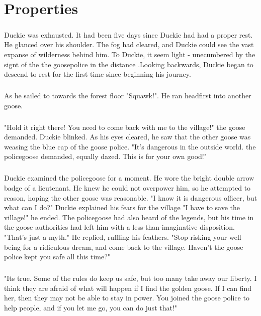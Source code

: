 \chapter{Properties}
\paragraph{} Duckie was exhausted. It had been five days since Duckie had had a proper rest. He glanced over his shoulder. The fog had cleared, and Duckie could see the vast expanse of wilderness behind him. To Duckie, it seem light - unecumbered by the signt of the the goosepolice in the distance .Looking backwards, Duckie began to descend to rest for the first time since beginning his journey. 
\paragraph{} As he sailed to towards the forest floor "Squawk!". He ran headfirst into another goose.
\paragraph{} "Hold it right there! You need to come back with me to the village!" the goose demanded. Duckie blinked. As his eyes cleared, he saw that the other goose was weasing the blue cap of the goose police. "It's dangerous in the outside world. the policegoose demanded, equally dazed. This is for your own good!"
\paragraph{} Duckie examined the policegoose for a moment. He wore the bright double arrow badge of a lieutenant. He knew he could not overpower him, so he attempted to reason, hoping the other goose was reasonable. "I know it is dangerous officer, but what can I do?" Duckie explained his fears for the village "I have to save the village!" he ended. The policegoose had also heard of the legends, but his time in the goose authorities had left him with a less-than-imaginative disposition. "That's just a myth." He replied, ruffling his feathers. "Stop risking your well-being for a ridiculous dream, and come back to the village. Haven't the goose police kept you safe all this time?"
\paragraph{} "Its true. Some of the rules do keep us safe, but too many take away our liberty. I think they are afraid of what will happen if I find the golden goose. If I can find her, then they may not be able to stay in power. You joined the goose police to help people, and if you let me go, you can do just that!"
